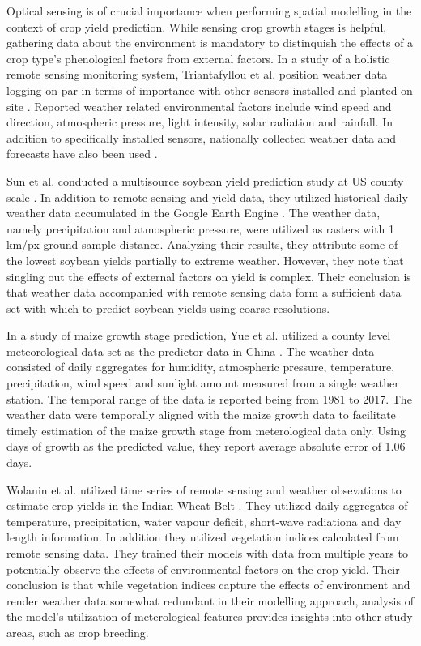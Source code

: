 Optical sensing is of crucial importance when performing spatial modelling in the context of crop yield prediction. While sensing crop growth stages is helpful, gathering data about the environment is mandatory to distinquish the effects of a crop type's phenological factors from external factors. In a study of a holistic remote sensing monitoring system, Triantafyllou et al. position weather data logging on par in terms of importance with other sensors installed and planted on site \cite{Triantafyllou2019}. Reported weather related environmental factors include wind speed and direction, atmospheric pressure, light intensity, solar radiation and rainfall. In addition to specifically installed sensors, nationally collected weather data and forecasts have also been used \cite{Kamilaris2017}.

Sun et al. conducted a multisource soybean yield prediction study at US county scale \cite{Sun2019}. In addition to remote sensing and yield data, they utilized historical daily weather data accumulated in the Google Earth Engine \cite{GoogleEarthEngine}. The weather data, namely precipitation and atmospheric pressure, were utilized as rasters with 1 km/px ground sample distance. Analyzing their results, they attribute some of the lowest soybean yields partially to extreme weather. However, they note that singling out the effects of external factors on yield is complex. Their conclusion is that weather data accompanied with remote sensing data form a sufficient data set with which to predict soybean yields using coarse resolutions.

In a study of maize growth stage prediction, Yue et al. utilized a county level meteorological data set as the predictor data in China \cite{Yue2020}. The weather data consisted of daily aggregates for humidity, atmospheric pressure, temperature, precipitation, wind speed and sunlight amount measured from a single weather station. The temporal range of the data is reported being from 1981 to 2017. The weather data were temporally aligned with the maize growth data to facilitate timely estimation of the maize growth stage from meterological data only. Using days of growth as the predicted value, they report average absolute error of 1.06 days.

Wolanin et al. utilized time series of remote sensing and weather obsevations to estimate crop yields in the Indian Wheat Belt \cite{Wolanin2020}. They utilized daily aggregates of temperature, precipitation, water vapour deficit, short-wave radiationa and day length information. In addition they utilized vegetation indices calculated from remote sensing data. They trained their models with data from multiple years to potentially observe the effects of environmental factors on the crop yield. Their conclusion is that while vegetation indices capture the effects of environment and render weather data somewhat redundant in their modelling approach, analysis of the model's utilization of meterological features provides insights into other study areas, such as crop breeding.


